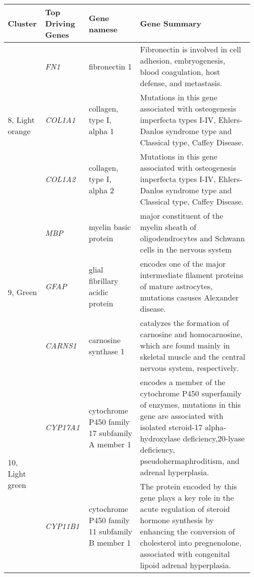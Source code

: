 \begin{table}[!hp]
\begin{adjustwidth}{-.5in}{0in}
\begin{tabular}{|p{0.6in}|p{0.6in}|p{1.3 in}|p{3.8in}|}
\hline
Cluster & Top Driving \qquad Genes & Gene namese  & Gene Summary \\
\hline
 \multirow{3}{4em}{\scriptsize{8, Light orange} } & \small{\textit{FN1}}  & \scriptsize{fibronectin 1} & \scriptsize{Fibronectin is involved in cell adhesion, embryogenesis, blood coagulation, host defense, and metastasis.}   \\
 					 & \small{\textit{COL1A1}} & \scriptsize{collagen, type I, alpha 1} & \scriptsize{Mutations in this gene associated with osteogenesis imperfecta types I-IV, Ehlers-Danlos syndrome type and Classical type, Caffey Disease}. \\
					      & \small{\textit{COL1A2}} & \scriptsize{collagen, type I, alpha 2} & \scriptsize{Mutations in this gene associated with osteogenesis imperfecta types I-IV, Ehlers-Danlos syndrome type and Classical type, Caffey Disease}. \\
\hline
 \multirow{3}{4em}{\scriptsize{9, Green} } & \small{\textit{MBP}} & \scriptsize{myelin basic protein} & \scriptsize{major constituent of the myelin sheath of oligodendrocytes and Schwann cells in the nervous system}    \\
 					 & \small{\textit{GFAP}} & \scriptsize{glial fibrillary acidic protein} & \scriptsize{encodes one of the major intermediate filament proteins of mature astrocytes, mutations casuses Alexander disease.} \\
					      & \small{\textit{CARNS1}} & \scriptsize{carnosine synthase 1} & \scriptsize{catalyzes the formation of carnosine and homocarnosine, which are found mainly in skeletal muscle and the central nervous system, respectively}. \\
\hline
 \multirow{3}{4em}{\scriptsize{10, Light green} } & \small{\textit{CYP17A1}} & \scriptsize{cytochrome P450 family 17 subfamily A member 1} & \scriptsize{encodes a member of the cytochrome P450 superfamily of enzymes, mutations in this gene are associated with isolated steroid-17 alpha-hydroxylase deficiency,20-lyase deficiency, pseudohermaphroditism, and adrenal hyperplasia.}    \\
 					 & \small{\textit{CYP11B1}} & \scriptsize{cytochrome P450 family 11 subfamily B member 1} & \scriptsize{The protein encoded by this gene plays a key role in the acute regulation of steroid hormone synthesis by enhancing the conversion of cholesterol into pregnenolone, associated with congenital lipoid adrenal hyperplasia.} \\

\end{tabular}
\end{adjustwidth}
\end{table}
